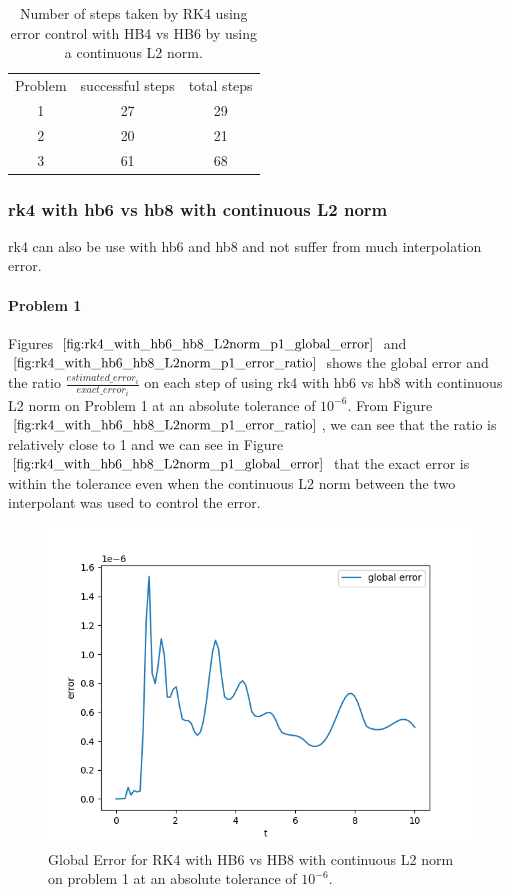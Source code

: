 \begin{table}[h]
\caption {Number of steps taken by RK4 using error control with HB4 vs HB6 by using a continuous L2 norm.} \label{tab:rk4_with_hb4_hb6_L2norm_nsteps}
\begin{center}
\begin{tabular}{ c c c } 
Problem & successful steps & total steps \\ 
1       & 27                         & 29 \\ 
2       & 20                         & 21 \\
3       & 61                         & 68 \\
\end{tabular}
\end{center}
\end{table}

\subsubsection{rk4 with hb6 vs hb8 with continuous L2 norm}
rk4 can also be use with hb6  and hb8 and not suffer from much interpolation error.



\paragraph{Problem 1} Figures $\ref{fig:rk4_with_hb6_hb8_L2norm_p1_global_error}$ and $\ref{fig:rk4_with_hb6_hb8_L2norm_p1_error_ratio}$ shows the global error and the ratio $\frac{estimated\_error_i}{exact\_error_i}$ on each step of using rk4 with hb6 vs hb8 with continuous L2 norm on Problem 1 at an absolute tolerance of $10^{-6}$. From Figure $\ref{fig:rk4_with_hb6_hb8_L2norm_p1_error_ratio}$, we can see that the ratio is relatively close to 1 and we can see in Figure  $\ref{fig:rk4_with_hb6_hb8_L2norm_p1_global_error}$ that the exact error is within the tolerance even when the continuous L2 norm between the two interpolant was used to control the error.

\begin{figure}[H]
\centering
\includegraphics[width=0.7\linewidth]{./figures/rk4_with_hb6_hb8_L2norm_p1_global_error}
\caption{Global Error for RK4 with HB6 vs HB8 with continuous L2 norm on problem 1 at an absolute tolerance of $10^{-6}$.}
\label{fig:rk4_with_hb6_hb8_L2norm_p1_global_error}
\end{figure}

